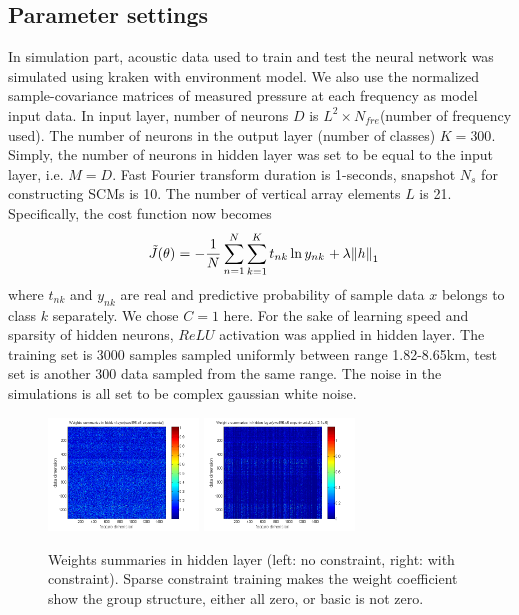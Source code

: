 \subsection{Parameter settings}
In simulation part, acoustic data used to train and test the neural network was simulated using kraken with environment model.  We also use the normalized sample-covariance matrices of measured pressure at each frequency as model input data. In input layer, number of neurons $D$ is $L^{2} \times N_{fre}$(number of frequency used). The number of neurons in the output layer (number of classes) $K = 300$. Simply, the number of neurons in hidden layer was set to be equal to the input layer, i.e. $M = D$. Fast	Fourier	transform duration is 1-seconds, snapshot $N_{s}$ for constructing SCMs is 10. The number of vertical array elements $L$ is 21. Specifically, the cost function now becomes
\begin{equation}
{\kern 1pt} {\kern 1pt} {\kern 1pt} {\kern 1pt} {\kern 1pt} {\kern 1pt} \tilde J(\theta ){\kern 1pt} {\kern 1pt} {\kern 1pt} {\rm{ = }}{\kern 1pt} {\kern 1pt} {\kern 1pt} {\rm{ - }}{{\rm{1}} \over N}\sum\limits_{n = 1}^N {\sum\limits_{k = 1}^K {{t_{nk}}\ln {y_{nk}}{\kern 1pt} {\kern 1pt} {\kern 1pt} {\rm{ + }}{\kern 1pt} {\kern 1pt} \lambda {{\left\| h \right\|}_1}} }
\end{equation}
where $t_{nk}$ and $y_{nk}$ are real and predictive probability of sample data $x$ belongs to class $k$ separately. We chose $C=1$ here.
For the sake of learning speed and sparsity of hidden neurons, $ReLU$ activation was applied in hidden layer.
The training set is 3000 samples sampled uniformly between range 1.82\--8.65km, test set is another 300 data sampled from the same range. The noise in the simulations is all set to be complex gaussian white noise.

\begin{figure}
\includegraphics[width=4cm,height=3cm]{figure/Weights_summaries_in_hidden_laye_swell_exp}
\includegraphics[width=4cm,height=3cm]{figure/Weights_summaries_in_hidden_layer_swell_exp_lambda_2_dot_1e_neg_5}
\caption{Weights summaries in hidden layer (left: no constraint, right: with constraint). Sparse constraint
training makes the weight coefficient show the group structure, either all zero, or basic is not zero.}
\end{figure}

